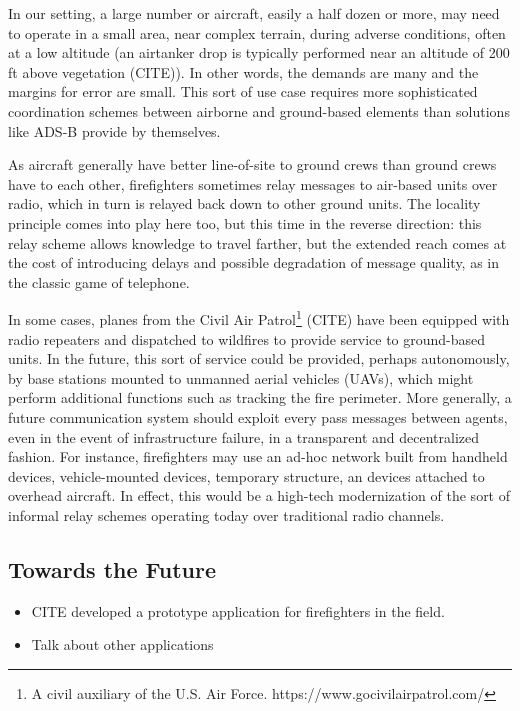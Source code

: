 \documentclass[]             %
{NASA}                       %
\theoremstyle{definition}
\providecommand{\tightlist}{%
  \setlength{\itemsep}{0pt}\setlength{\parskip}{0pt}}
\begin{document}
In our setting, a large number or aircraft, easily a half dozen or more,
may need to operate in a small area, near complex terrain, during
adverse conditions, often at a low altitude (an airtanker drop is
typically performed near an altitude of 200 ft above vegetation (CITE)).
In other words, the demands are many and the margins for error are
small. This sort of use case requires more sophisticated coordination
schemes between airborne and ground-based elements than solutions like
ADS-B provide by themselves.

As aircraft generally have better line-of-site to ground crews than
ground crews have to each other, firefighters sometimes relay messages
to air-based units over radio, which in turn is relayed back down to
other ground units. The locality principle comes into play here too, but
this time in the reverse direction: this relay scheme allows knowledge
to travel farther, but the extended reach comes at the cost of
introducing delays and possible degradation of message quality, as in
the classic game of telephone.

In some cases, planes from the Civil Air Patrol\footnote{A civil
  auxiliary of the U.S. Air Force. https://www.gocivilairpatrol.com/}
(CITE) have been equipped with radio repeaters and dispatched to
wildfires to provide service to ground-based units. In the future, this
sort of service could be provided, perhaps autonomously, by base
stations mounted to unmanned aerial vehicles (UAVs), which might perform
additional functions such as tracking the fire perimeter. More
generally, a future communication system should exploit every pass
messages between agents, even in the event of infrastructure failure, in
a transparent and decentralized fashion. For instance, firefighters may
use an ad-hoc network built from handheld devices, vehicle-mounted
devices, temporary structure, an devices attached to overhead aircraft.
In effect, this would be a high-tech modernization of the sort of
informal relay schemes operating today over traditional radio channels.

\subsection{Towards the Future}\label{towards-the-future}

\begin{itemize}
\tightlist
\item
  CITE developed a prototype application for firefighters in the field.
\item
  Talk about other applications
\end{itemize}
\end{document}
